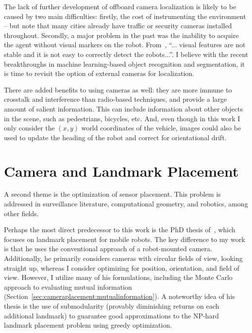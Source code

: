 \documentclass[a4paper,12pt,twoside,openright]{report}
\begin{document}
The lack of further development of offboard camera localization
is likely to be caused by two main difficulties: 
firstly, the cost of instrumenting the environment -- but note
that many cities already have traffic or security cameras installed throughout.
Secondly, a major problem in the past was the inability to acquire
the agent without visual markers on the robot. From~\cite{menegatti2005distributed}, 
``... visual features are not stable and it is not easy to correctly detect the robots...''. 
I believe with the recent breakthroughs in machine learning-based object recognition 
and segmentation, it is time to revisit the option of external cameras for localization. 

There are added benefits to using cameras as well: they are more immune
to crosstalk and interference than radio-based techniques, and provide
a large amount of salient information. This can include 
information about other objects in the scene, such as pedestrians,
bicycles, etc. And, even though in this work I only consider
the $(x,y)$ world coordinates of the vehicle, images could also be used
to update the heading of the robot and correct for orientational drift.






\section{Camera and Landmark Placement}

A second theme is the optimization of sensor placement. This problem is addressed
in surveillance literature, computational geometry, and robotics, among other fields.

Perhaps the most direct predecessor to this work is the PhD thesis of~\citeauthor{beinhofer2014landmark}\cite{beinhofer2014landmark},
which focuses on landmark placement for mobile robots. The key difference to my work
is that he uses the conventional approach of a robot-mounted camera.
Additionally, he primarily considers cameras with circular fields of view, looking
straight up, whereas I consider optimizing for position, orientation,
and field of view. However, I utilize many of his formulations, including
the Monte Carlo approach to evaluating mutual information (Section~\ref{sec:cameraplacement:mutualinformation}).
A noteworthy idea of his thesis is the use of submodularity (provably diminishing returns
on each additional landmark) to guarantee good approximations to the NP-hard landmark placement problem 
using greedy optimization.
\end{document}
